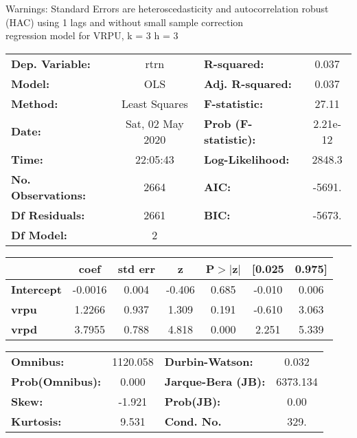 Warnings: \newline
 [1] Standard Errors are heteroscedasticity and autocorrelation robust (HAC) using 1 lags and without small sample correction\\ 

regression model for VRPU, k = 3 h = 3\begin{center}
\begin{tabular}{lclc}
\toprule
\textbf{Dep. Variable:}    &       rtrn       & \textbf{  R-squared:         } &     0.037   \\
\textbf{Model:}            &       OLS        & \textbf{  Adj. R-squared:    } &     0.037   \\
\textbf{Method:}           &  Least Squares   & \textbf{  F-statistic:       } &     27.11   \\
\textbf{Date:}             & Sat, 02 May 2020 & \textbf{  Prob (F-statistic):} &  2.21e-12   \\
\textbf{Time:}             &     22:05:43     & \textbf{  Log-Likelihood:    } &    2848.3   \\
\textbf{No. Observations:} &        2664      & \textbf{  AIC:               } &    -5691.   \\
\textbf{Df Residuals:}     &        2661      & \textbf{  BIC:               } &    -5673.   \\
\textbf{Df Model:}         &           2      & \textbf{                     } &             \\
\bottomrule
\end{tabular}
\begin{tabular}{lcccccc}
                   & \textbf{coef} & \textbf{std err} & \textbf{z} & \textbf{P$> |$z$|$} & \textbf{[0.025} & \textbf{0.975]}  \\
\midrule
\textbf{Intercept} &      -0.0016  &        0.004     &    -0.406  &         0.685        &       -0.010    &        0.006     \\
\textbf{vrpu}      &       1.2266  &        0.937     &     1.309  &         0.191        &       -0.610    &        3.063     \\
\textbf{vrpd}      &       3.7955  &        0.788     &     4.818  &         0.000        &        2.251    &        5.339     \\
\bottomrule
\end{tabular}
\begin{tabular}{lclc}
\textbf{Omnibus:}       & 1120.058 & \textbf{  Durbin-Watson:     } &    0.032  \\
\textbf{Prob(Omnibus):} &   0.000  & \textbf{  Jarque-Bera (JB):  } & 6373.134  \\
\textbf{Skew:}          &  -1.921  & \textbf{  Prob(JB):          } &     0.00  \\
\textbf{Kurtosis:}      &   9.531  & \textbf{  Cond. No.          } &     329.  \\
\bottomrule
\end{tabular}
\end{center}

